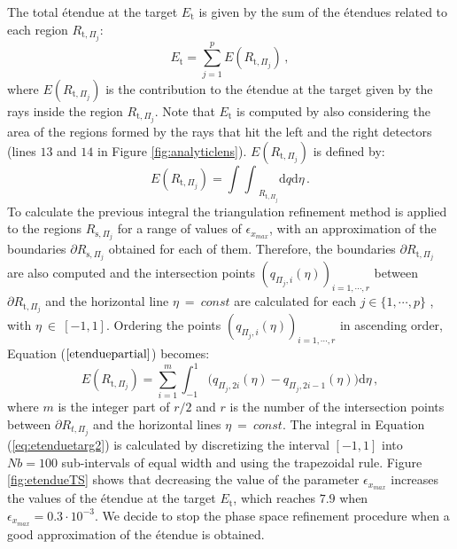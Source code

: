  The total \'{e}tendue at the target $E_{\textrm{t}}$ is given by the sum of the \'{e}tendues related to each region $R_{\textrm{t}, \Pi_{j}}$:
 \begin{equation}
 \label{eq:etenduetarget}
 E_{\textrm{t}} = \sum_{j = 1}^p E(R_{\textrm{t}, \Pi_j})\,,
 \end{equation}
 where $E(R_{\textrm{t}, \Pi_j})$ is the contribution to the \'{e}tendue at the target given by the rays inside the region $R_{\textrm{t}, \Pi_j}$. Note that $E_{\textrm{t}}$ is computed by also considering the area of the regions formed by the rays that hit the left and the right detectors (lines $13$ and $14$ in Figure \ref{fig:analyticlens}). $E(R_{\textrm{t}, \Pi_j})$ is defined by:
  \begin{equation}\label{etenduepartial}
 E(R_{\textrm{t}, \Pi_j}) = {\int\!\!\int}_{R_{\textrm{t}, \Pi_j}} \textrm{d}q\textrm{d}\eta \,.
 \end{equation}
 To calculate the previous integral the triangulation refinement method is applied to the regions $R_{\textrm{s}, \Pi_j}$ for a range of values of $\epsilon_{x_{max}}$, with an approximation of the boundaries $\partial{R_{\textrm{s}, \Pi_j}}$ obtained for each of them.
 Therefore, the boundaries $\partial{R_{\textrm{t}, \Pi_j}}$ are also computed and the intersection points $(q_{\Pi_j,i}( \eta))_{i = 1, \cdots, r}$ between $\partial R_{\textrm{t},\Pi_j}$
and the horizontal line $\eta ~=~ const$ are calculated for each $j \in \{1, \cdots, p\}$ , with $\eta~\in~[-1,1]$. Ordering the points $(q_{\Pi_j,i}( \eta))_{i = 1, \cdots, r}$ in ascending order,
 Equation ($\ref{etenduepartial}$) becomes:
\begin{equation}
\label{eq:etenduetarg2}
 E(R_{\textrm{t}, \Pi_j}) =\sum_{i = 1}^{m} \int_{-1}^{1}{(q_{\Pi_j, 2i}( \eta)}-{q_{\Pi_j,2i-1} ( \eta) )} \textrm{d}\eta \,,
\end{equation}
where $m$ is the integer part of $r/2$ and $r$ is the number of the intersection points between $\partial R_{t,\Pi_j}$
and the horizontal lines $\eta ~=~ const$. The integral in Equation (\ref{eq:etenduetarg2}) is calculated by discretizing the interval $[-1, 1]$ into $Nb=100$ sub-intervals of equal width and using the trapezoidal rule.
Figure \ref{fig:etendueTS} shows that decreasing the value of the parameter $\epsilon_{x_{max}}$ increases the values of the \'{e}tendue at the target $E_{\textrm{t}}$, which reaches $7.9$  when $\epsilon_{x_{max}}= 0.3\cdot 10^{-3}$. We decide to stop the phase space refinement procedure when a good approximation of the \'{e}tendue is obtained.
